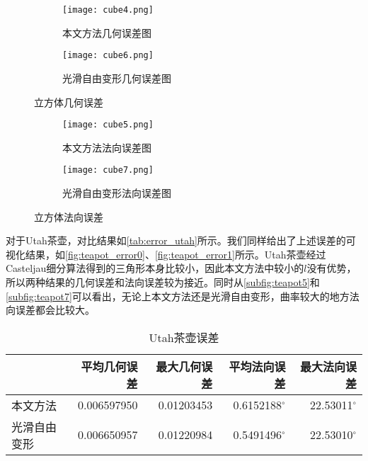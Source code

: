 \begin{figure}[htbp]
	\centering
	\begin{subfigure}[b]{.45\textwidth}
		\centering
		\texttt{[image: cube4.png]}
		\caption{本文方法几何误差图}\label{subfig:cube4}
	\end{subfigure}%
	\begin{subfigure}[b]{.45\textwidth}
		\centering
		\texttt{[image: cube6.png]}
		\caption{光滑自由变形几何误差图}\label{subfig:cube6}
	\end{subfigure}
	\caption{立方体几何误差}\label{fig:cube_error0}
\end{figure}
\begin{figure}[htbp]
	\centering
	\begin{subfigure}[b]{.45\textwidth}
		\centering
		\texttt{[image: cube5.png]}
		\caption{本文方法法向误差图}\label{subfig:cube5}
	\end{subfigure}%
	\begin{subfigure}[b]{.45\textwidth}
		\centering
		\texttt{[image: cube7.png]}
		\caption{光滑自由变形法向误差图}\label{subfig:cube7}
	\end{subfigure}
	\caption{立方体法向误差}\label{fig:cube_error1}
\end{figure}

对于Utah茶壶，对比结果如\autoref{tab:error_utah}所示。我们同样给出了上述误差的可视化结果，如\autoref{fig:teapot_error0}、\autoref{fig:teapot_error1}所示。Utah茶壶经过Casteljau细分算法得到的三角形本身比较小，因此本文方法中较小的$l$没有优势，所以两种结果的几何误差和法向误差较为接近。同时从\autoref{subfig:teapot5}和\autoref{subfig:teapot7}可以看出，无论上本文方法还是光滑自由变形，曲率较大的地方法向误差都会比较大。

\begin{table}[htbp]
    \centering
    \caption{Utah茶壶误差} \label{tab:error_utah}
    \begin{tabular}{lrrrr}
    \toprule
        & 平均几何误差 & 最大几何误差 & 平均法向误差 & 最大法向误差 \\
    \midrule
        本文方法    & \num{0.006597950} & \num{0.01203453} & \num[scientific-notation=false]{0.6152188}$^\circ$ & \num[scientific-notation=false]{22.53011}$^\circ$ \\
        光滑自由变形& \num{0.006650957} & \num{0.01220984} & \num[scientific-notation=false]{0.5491496}$^\circ$ & \num[scientific-notation=false]{22.53010}$^\circ$ \\
    \bottomrule
    \end{tabular}
\end{table}

